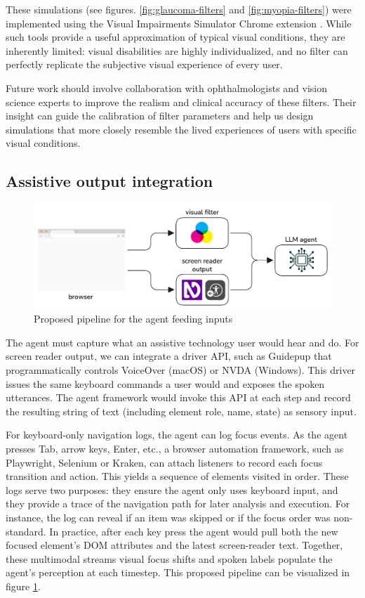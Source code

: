 These simulations (see figures. \ref{fig:glaucoma-filters} and \ref{fig:myopia-filters}) were implemented using the Visual Impairments Simulator Chrome extension \cite{visual_impairments_simulator}. While such tools provide a useful approximation of typical visual conditions, they are inherently limited: visual disabilities are highly individualized, and no filter can perfectly replicate the subjective visual experience of every user.

Future work should involve collaboration with ophthalmologists and vision science experts to improve the realism and clinical accuracy of these filters. Their insight can guide the calibration of filter parameters and help us design simulations that more closely resemble the lived experiences of users with specific visual conditions.

\subsection{Assistive output integration}

\begin{figure}
    \centering
    \includegraphics[width=1\linewidth]{imgs/flow.png}
\caption{Proposed pipeline for the agent feeding inputs}
\label{fig:pipeline}
\end{figure}


The agent must capture what an assistive technology user would hear and do. For screen reader output, we can integrate a driver API, such as Guidepup that programmatically controls VoiceOver (macOS) or NVDA (Windows). This driver issues the same keyboard commands a user would and exposes the spoken utterances\cite{guidepup2025}. The agent framework would invoke this API at each step and record the resulting string of text (including element role, name, state) as sensory input.

For keyboard-only navigation logs, the agent can log focus events. As the agent presses Tab, arrow keys, Enter, etc., a browser automation framework, such as Playwright, Selenium or Kraken, can attach listeners to record each focus transition and action. This yields a sequence of elements visited in order\cite{ravelo2023kraken}. These logs serve two purposes: they ensure the agent only uses keyboard input, and they provide a trace of the navigation path for later analysis and execution. For instance, the log can reveal if an item was skipped or if the focus order was non-standard. In practice, after each key press the agent would pull both the new focused element's DOM attributes and the latest screen-reader text. Together, these multimodal streams visual focus shifts and spoken labels populate the agent's perception at each timestep. This proposed pipeline can be visualized in figure \ref{fig:pipeline}.

